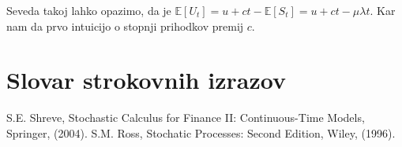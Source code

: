\documentclass[12pt, a4paper, reqno]{amsart}
\theoremstyle{definition} %
\theoremstyle{plain} %
\newcommand{\geslo}[2]{\noindent\textbf{#1}\hspace*{3mm}\hangindent=\parindent\hangafter=1 #2}
\newcommand{\E}{\mathbb{E}}
\newcommand{\1}{\mathds{1}}
\begin{document}
    Seveda takoj lahko opazimo, da je $\E\left[U_t\right] = u + ct - \E\left[S_t\right] = u + ct - \mu\lambda t$.
    Kar nam da prvo intuicijo o stopnji prihodkov premij $c$.



















\section*{Slovar strokovnih izrazov}

%
%


\begin{thebibliography}{99}

S.E. Shreve, Stochastic Calculus for Finance II: Continuous-Time Models, Springer, (2004).
S.M. Ross, Stochatic Processes: Second Edition, Wiley, (1996).
\end{thebibliography}
\end{document}
